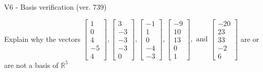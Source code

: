 \begin{exercise}
  \begin{exerciseTitle}V6 - Basis verification (ver. 739)\end{exerciseTitle}
  \begin{exerciseStatement}
    Explain why the vectors \(\left[\begin{array}{r}
1 \\
0 \\
4 \\
-5 \\
4
\end{array}\right] , \left[\begin{array}{r}
3 \\
-3 \\
-3 \\
-3 \\
0
\end{array}\right] , \left[\begin{array}{r}
-1 \\
1 \\
0 \\
-4 \\
-3
\end{array}\right] , \left[\begin{array}{r}
-9 \\
10 \\
13 \\
0 \\
1
\end{array}\right] , \text{ and } \left[\begin{array}{r}
-20 \\
23 \\
33 \\
-2 \\
6
\end{array}\right]\) are or are not a basis of \(\mathbb{R}^5\)	



\end{exerciseStatement}
\end{exercise}
